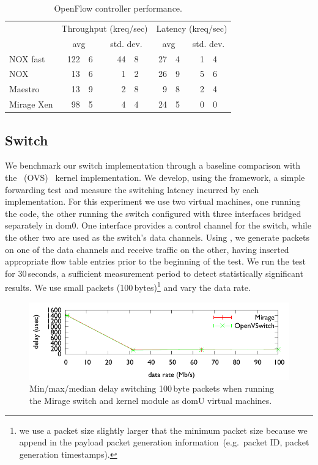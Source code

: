 \begin{table}
\newcommand\T{\rule{0pt}{2.6ex}}
\newcommand\B{\rule[-1.2ex]{0pt}{0pt}}
\centering
\begin{tabular} { l | r@{.}l r@{.}l | r@{.}l r@{.}l }
\hline
\T \multirow{2}{*}{Controller} 
   & \multicolumn{4}{c|}{Throughput (kreq/sec)}  
   & \multicolumn{4}{c}{Latency (kreq/sec)} \\
\B & \multicolumn{2}{c}{avg} & \multicolumn{2}{c|}{std. dev.} 
   & \multicolumn{2}{c}{avg} & \multicolumn{2}{c}{std. dev.} \\
\hline
\T NOX fast   & 122&6 & \quad{} 44&8 & 27&4 & \quad{} 1&4 \\
NOX           &  13&6 &  1&2 & 26&9 & 5&6 \\
Maestro       &  13&9 &  2&8 &  9&8 & 2&4 \\
\B Mirage Xen &  98&5 &  4&4 & 24&5 & 0&0 \\
\hline
\end{tabular}
\caption{\label{tbl:controller}OpenFlow controller performance.}
\end{table}

\subsection{\mirage Switch} \label{sec:of-switch-perf}

We benchmark our \mirage \of switch implementation through a baseline comparison
with the \ovs~(OVS)~\cite{openvswitch} kernel implementation.  We
develop, using the \oflops framework, a simple forwarding test and measure the
switching latency incurred by each implementation.  For this experiment we use
two virtual machines, one running the \oflops code, the other running the
\of switch configured with three interfaces bridged separately in dom0. One
interface provides a control channel for the switch, while the other two are
used as the switch's data channels. Using \oflops, we generate packets on one of
the data channels and receive traffic on the other, having inserted appropriate
flow table entries prior to the beginning of the test. We run the test for
30\,seconds, a sufficient measurement period to detect statistically significant
results. We use small packets (100\,bytes)\footnote{we use a packet size
  slightly larger that the minimum packet size because we append in the
  payload packet generation information~(e.g.~packet ID, packet generation
  timestamps).} and vary the data rate.

\begin{figure}
\centering
\includegraphics[width=\columnwidth]{switch-media-delay}
\caption{\label{fig:switch}Min/max/median delay switching 100\,byte packets
        when running the Mirage switch and \ovs kernel module as domU
        virtual machines.}
\end{figure}

